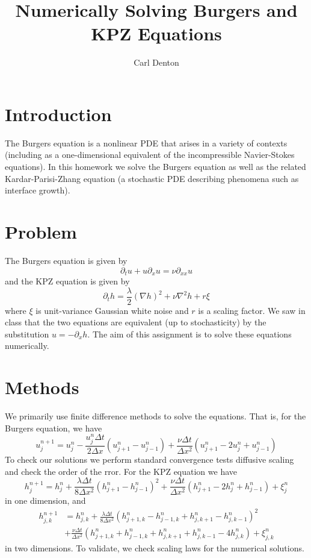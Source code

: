 \documentclass[12pt]{article}
\author{Carl Denton}
\title{Numerically Solving Burgers and KPZ Equations}
\date{\vspace{-6ex}}
\begin{document}
\maketitle

\section{Introduction}

The Burgers equation is a nonlinear PDE that arises in a variety of contexts (including as a one-dimensional equivalent of the incompressible Navier-Stokes equations). In this homework we solve the Burgers equation as well as the related Kardar-Parisi-Zhang equation (a stochastic PDE describing phenomena such as interface growth).

\section{Problem}

The Burgers equation is given by
\[\partial_t u + u\partial_x u = \nu \partial_{xx} u\]
and the KPZ equation is given by
\[\partial_t h = \frac{\lambda}{2}\left( \nabla h\right)^2 + \nu \nabla^2h + r\xi\]
where $\xi$ is unit-variance Gaussian white noise and $r$ is a scaling factor. We saw in class that the two equations are equivalent (up to stochasticity) by the substitution $u = -\partial_x h$. The aim of this assignment is to solve these equations numerically.

\section{Methods}
We primarily use finite difference methods to solve the equations. That is, for the Burgers equation, we have
\[u_j^{n+1} = u_j^n - \frac{u_j^n\Delta t}{2\Delta x}\left(u_{j+1}^n - u_{j-1}^n\right) + \frac{\nu \Delta t}{\Delta x^2} \left(u_{j+1}^n - 2u_j^n+u_{j-1}^n\right)\]
To check our solutions we perform standard convergence tests diffusive scaling and check the order of the rror. 
For the KPZ equation we have
\[h_j^{n+1} = h_j^n + \frac{\lambda \Delta t}{8\Delta x^2} \left(h_{j+1}^n - h_{j-1}^n\right)^2 + \frac{\nu \Delta t}{\Delta x^2}\left(h_{j+1}^n - 2h_j^n + h_{j-1}^n\right) + \xi_j^n\]
in one dimension, and 
\begin{align*}
 h_{j, k}^{n+1} &= h_{j, k}^n + \frac{\lambda \Delta t}{8 \Delta x^2}\left(h_{j+1, k}^n - h_{j-1,k}^n + h_{j, k+1}^n - h_{j, k-1}^n \right)^2 \\
&+ \frac{\nu\Delta t}{\Delta x^2} \left(h_{j+1, k}^n + h_{j-1, k}^n + h_{j, k+1}^n + h_{j, k-1}^n - 4h_{j, k}^n \right) + \xi_{j, k}^n
\end{align*}
in two dimensions.
To validate, we check scaling laws for the numerical solutions.
\end{document}
